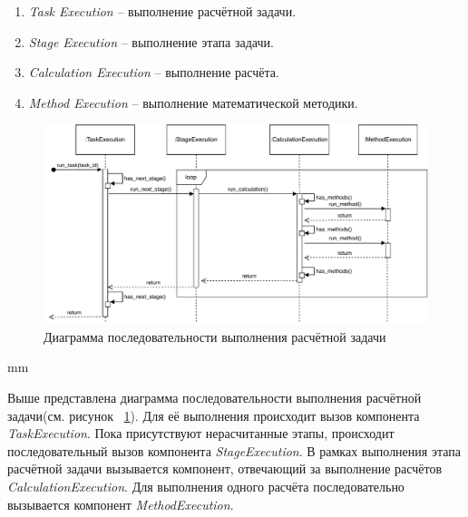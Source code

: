 \begin{enumerate}
	\item {
		\textit{Task Execution} -- выполнение расчётной задачи.
	}
	\item {
		\textit{Stage Execution} -- выполнение этапа задачи.
	}
	\item {
		\textit{Calculation Execution} -- выполнение расчёта.
	}
	\item {
		\textit{Method Execution} -- выполнение математической методики.
	}
\end{enumerate}

\begin{figure}[H]
	\includegraphics[width=\textwidth]{pictures/sequence}
	\caption{Диаграмма последовательности выполнения расчётной задачи}
	\label{pic:architecture__orchestrator-sequence}
\end{figure}
 mm

Выше представлена диаграмма последовательности выполнения расчётной
задачи(см. рисунок \ \ref{pic:architecture__orchestrator-sequence}).
Для её выполнения происходит вызов компонента \textit{TaskExecution}. Пока присутствуют
нерасчитанные этапы, происходит последовательный вызов компонента \textit{StageExecution}.
В рамках выполнения этапа расчётной задачи вызывается компонент, отвечающий за выполнение расчётов
\textit{CalculationExecution}.
Для выполнения одного расчёта последовательно вызывается компонент \textit{MethodExecution}.